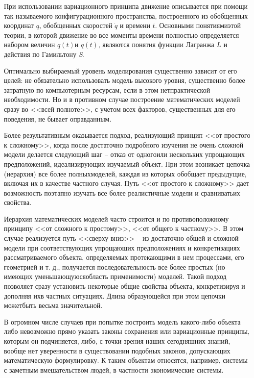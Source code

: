 \documentclass[a4paper,14pt]{article}
\begin{document}
При использовании вариационного принципа движение описывается 
при помощи так называемого конфигурационного пространства, 
построенного из обобщенных координат $q$, 
обобщенных скоростей $ \dot{q}$ и времени $t$. 
Основными понятиямиэтой теории, в которой движение во все 
моменты времени полностью определяется набором величин
$q(t)$и $\dot{q}(t)$, являются понятия функции Лагранжа
$L$ и действия по Гамильтону $S$.

Оптимально выбираемый уровень моделирования существенно зависит от
его целей: не обязательно использовать модель высокого уровня, 
существенно более затратную по компьютерным ресурсам, если в этом 
нетпрактической необходимости. Но и в противном случае построение 
математических моделей сразу во <<всей полноте>>, с учетом всех факторов,
существенных для его поведения, не бывает оправданным.

Более результативным оказывается подход, реализующий принцип <<от 
простого к сложному>>, когда после достаточно подробного изучения не
очень сложной модели делается следующий шаг --
отказ от одногоили нескольких упрощающих предположений, идеализирующих 
изучаемый объект. При этом возникает цепочка (иерархия) все более 
полныхмоделей, каждая из которых обобщает предыдущие, включая их 
в качестве частного случая. Путь <<от простого к сложному>> дает возможность
поэтапно изучать все более реалистичные модели и сравниватьих свойства.

Иерархия математических моделей часто строится и по противоположному
принципу <<от сложного к простому>>, <<от общего к частному>>.
В этом случае реализуется путь <<сверху вниз>> -- из достаточно
общей и сложной модели при соответствующих упрощающих предположениях 
и конкретизациях рассматриваемого объекта, определяемых протекающими 
в нем процессами, его геометрией и т. д., получается последовательность все 
более простых (но имеющих уменьшающуюсяобласть применимости) моделей.
Такой подход позволяет сразу установить некоторые общие свойства 
объекта, конкретизируя и дополняя ихв частных ситуациях. 
Длина образующейся при этом цепочки можетбыть весьма значительной.

В огромном числе случаев при попытке построить модель какого-либо 
объекта либо невозможно прямо указать законы сохранения или вариационные
принципы, которым он подчиняется, либо, с точки зрения наших сегодняшних
знаний, вообще нет уверенности в существовании подобных законов, допускающих
математическую формулировку. К таким объектам относятся, например, системы
с заметным вмешательством людей, в частности экономические системы.
\end{document}
